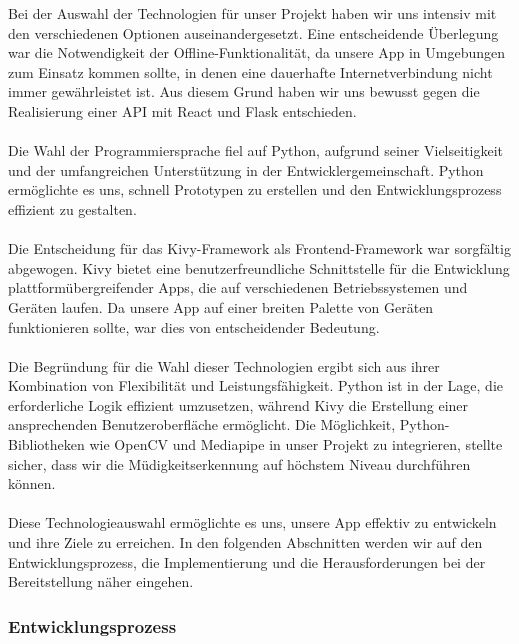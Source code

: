 		Bei der Auswahl der Technologien für unser Projekt haben wir uns intensiv mit den verschiedenen Optionen auseinandergesetzt. Eine entscheidende Überlegung war die Notwendigkeit der Offline-Funktionalität, da unsere App in Umgebungen zum Einsatz kommen sollte, in denen eine dauerhafte Internetverbindung nicht immer gewährleistet ist. Aus diesem Grund haben wir uns bewusst gegen die Realisierung einer API mit React und Flask entschieden.
		\\\\
		Die Wahl der Programmiersprache fiel auf Python, aufgrund seiner Vielseitigkeit und der umfangreichen Unterstützung in der Entwicklergemeinschaft. Python ermöglichte es uns, schnell Prototypen zu erstellen und den Entwicklungsprozess effizient zu gestalten.
		\\\\
		Die Entscheidung für das Kivy-Framework als Frontend-Framework war sorgfältig abgewogen. Kivy bietet eine benutzerfreundliche Schnittstelle für die Entwicklung plattformübergreifender Apps, die auf verschiedenen Betriebssystemen und Geräten laufen. Da unsere App auf einer breiten Palette von Geräten funktionieren sollte, war dies von entscheidender Bedeutung.
		\\\\
		Die Begründung für die Wahl dieser Technologien ergibt sich aus ihrer Kombination von Flexibilität und Leistungsfähigkeit. Python ist in der Lage, die erforderliche Logik effizient umzusetzen, während Kivy die Erstellung einer ansprechenden Benutzeroberfläche ermöglicht. Die Möglichkeit, Python-Bibliotheken wie OpenCV und Mediapipe in unser Projekt zu integrieren, stellte sicher, dass wir die Müdigkeitserkennung auf höchstem Niveau durchführen können.
		\\\\
		Diese Technologieauswahl ermöglichte es uns, unsere App effektiv zu entwickeln und ihre Ziele zu erreichen. In den folgenden Abschnitten werden wir auf den Entwicklungsprozess, die Implementierung und die Herausforderungen bei der Bereitstellung näher eingehen.
		
	\subsubsection{Entwicklungsprozess}
	\label{sssec:entwicklung}
		
